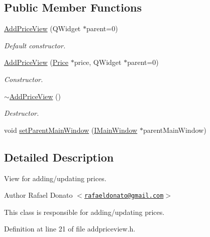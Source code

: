 \subsection*{\-Public \-Member \-Functions}
\begin{DoxyCompactItemize}
\item 
\hyperlink{class_add_price_view_a2681abb6ea29b2533a75dba71b4df7e3}{\-Add\-Price\-View} (\-Q\-Widget $\ast$parent=0)
\begin{DoxyCompactList}\small\item\em \-Default constructor. \end{DoxyCompactList}\item 
\hyperlink{class_add_price_view_a0371725d58442e9fc43f02b7cf46d59b}{\-Add\-Price\-View} (\hyperlink{class_price}{\-Price} $\ast$price, \-Q\-Widget $\ast$parent=0)
\begin{DoxyCompactList}\small\item\em \-Constructor. \end{DoxyCompactList}\item 
\hyperlink{class_add_price_view_a7ad095e14323928e0b7c521cd05e1e71}{$\sim$\-Add\-Price\-View} ()
\begin{DoxyCompactList}\small\item\em \-Destructor. \end{DoxyCompactList}\item 
void \hyperlink{class_add_price_view_afb28e835e815955ef7eadd95819ef05b}{set\-Parent\-Main\-Window} (\hyperlink{class_i_main_window}{\-I\-Main\-Window} $\ast$parent\-Main\-Window)
\end{DoxyCompactItemize}


\subsection{\-Detailed \-Description}
\-View for adding/updating prices. 

\begin{DoxyAuthor}{\-Author}
\-Rafael \-Donato $<$\href{mailto:rafaeldonato@gmail.com}{\tt rafaeldonato@gmail.\-com}$>$
\end{DoxyAuthor}
\-This class is responsible for adding/updating prices. 

\-Definition at line 21 of file addpriceview.\-h.



